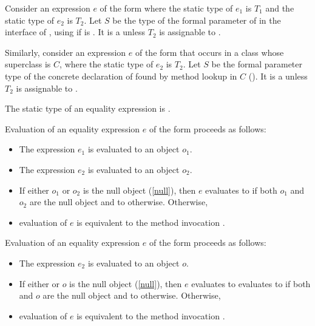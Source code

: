 \documentclass[makeidx]{article}
\begin{document}
{\LMHash{}%
Consider an expression $e$ of the form 
where the static type of $e_1$ is $T_1$
and the static type of $e_2$ is $T_2$.
Let $S$ be the type of the formal parameter of
 in the interface of ,
using  if  is .
It is a  unless $T_2$ is assignable to .

\LMHash{}%
Similarly, consider an expression $e$ of the form
 that occurs in a class whose superclass is
$C$, where the static type of $e_2$ is $T_2$. Let $S$ be the formal
parameter type of the concrete declaration of 
found by method lookup in $C$
().
It is a  unless $T_2$ is assignable to
.


\LMHash{}%
The static type of an equality expression is .

\LMHash{}%
Evaluation of an equality expression $e$ of the form 
proceeds as follows:
\begin{itemize}
\item The expression $e_1$ is evaluated to an object $o_1$.
\item The expression $e_2$ is evaluated to an object $o_2$.
\item If either $o_1$ or $o_2$ is the null object (\ref{null}),
  then $e$ evaluates to \TRUE{} if both $o_1$ and $o_2$ are the null object
  and to \FALSE{} otherwise.
Otherwise,
\item evaluation of $e$ is equivalent to the method invocation
  .
\end{itemize}

\LMHash{}%
Evaluation of an equality expression $e$ of the form
proceeds as follows:
\begin{itemize}
\item The expression $e_2$ is evaluated to an object $o$.
\item If either \THIS{} or $o$ is the null object (\ref{null}),
  then $e$ evaluates to evaluates to \TRUE{}
  if both \THIS{} and $o$ are the null object
  and to \FALSE{} otherwise.
Otherwise,
\item evaluation of $e$ is equivalent to the method invocation
  .
\end{itemize}

}
\end{document}
